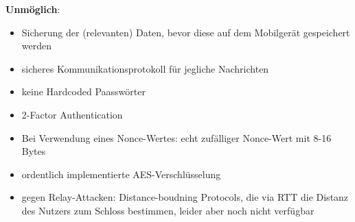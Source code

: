     \bigskip
    \noindent \textbf{Unmöglich}:
    \begin{itemize}
        \item Sicherung der (relevanten) Daten, bevor diese auf dem Mobilgerät gespeichert werden\cite{Ye2017}
        \item sicheres Kommunikationsprotokoll für jegliche Nachrichten\cite{Miessler,Ye2017}
        \item keine Hardcoded Paasswörter\cite{Rose2016}
        \item 2-Factor Authentication\cite{Rose2016}
        \item Bei Verwendung eines Nonce-Wertes: echt zufälliger Nonce-Wert mit 8-16 Bytes\cite{Rose2016}
        \item ordentlich implementierte AES-Verschlüsselung\cite{Rose2016}
        \item gegen Relay-Attacken: Distance-boudning Protocols, die via RTT die Distanz des Nutzers zum Schloss bestimmen, leider aber noch nicht verfügbar\cite{Ho2016} \textrightarrow\ %
    \end{itemize}
    
